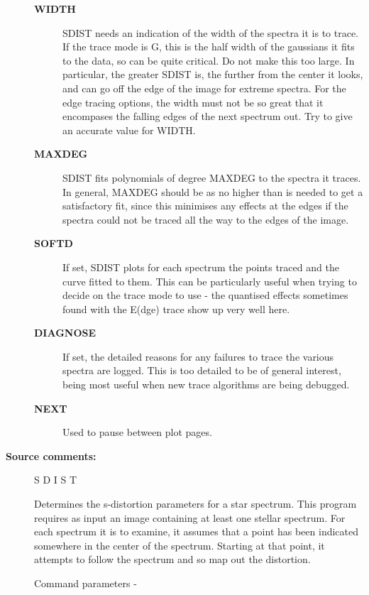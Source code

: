 \begin{description}
\begin{description}
\item [\textbf{WIDTH}]
 SDIST needs an indication of the width of the spectra it is to trace.
 If the trace mode is G, this is the half width of the gaussians it
 fits to the data, so can be quite critical.  Do not make this too
 large.  In particular, the greater SDIST is, the further from the
 center it looks, and can go off the edge of the image for extreme
 spectra.  For the edge tracing options, the width must not be so
 great that it encompases the falling edges of the next spectrum out.
 Try to give an accurate value for WIDTH.
\item [\textbf{MAXDEG}]
 SDIST fits polynomials of degree MAXDEG to the spectra it traces.  In
 general, MAXDEG should be as no higher than is needed to get a
 satisfactory fit, since this minimises any effects at the edges if
 the spectra could not be traced all the way to the edges of the
 image.
\item [\textbf{SOFTD}]
 If set, SDIST plots for each spectrum the points traced and
 the  curve fitted to them.  This can be particularly useful
 when trying to decide on the trace mode to use - the quantised
 effects sometimes found with the E(dge) trace show up very
 well here.
\item [\textbf{DIAGNOSE}]
 If set, the detailed reasons for any failures to trace the
 various spectra are logged.  This is too detailed to be of
 general interest, being most useful when new trace algorithms
 are being debugged.
\item [\textbf{NEXT}]
 Used to pause between plot pages.
\end{description}

\item [\textbf{Source comments:}]
\begin{terminalv}
 S D I S T

 Determines the s-distortion parameters for a star spectrum.
 This program requires as input an image containing at least one
 stellar spectrum.  For each spectrum it is to examine, it
 assumes that a point has been indicated somewhere in the center
 of the spectrum.  Starting at that point, it attempts to follow
 the spectrum and so map out the distortion.

 Command parameters -


\end{terminalv}
\end{description}
